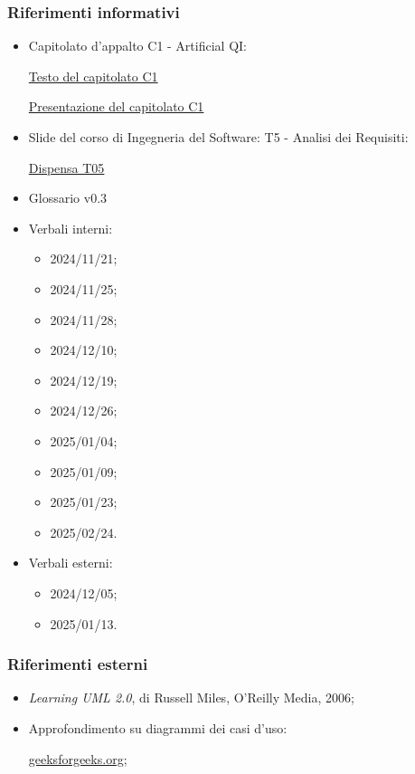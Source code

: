 \subsubsection{Riferimenti informativi}
\label{subsubsec:RiferimentiInformativi}
\begin{itemize}
    \item Capitolato d'appalto C1 - Artificial QI:
    
    \href{https://www.math.unipd.it/~tullio/IS-1/2024/Progetto/C1.pdf}{Testo del capitolato C1}
    
    \href{https://www.math.unipd.it/~tullio/IS-1/2024/Progetto/C1p.pdf}{Presentazione del capitolato C1}
    
    \item Slide del corso di Ingegneria del Software: T5 - Analisi dei Requisiti:
    
    \href{https://www.math.unipd.it/~tullio/IS-1/2024/Dispense/T05.pdf}{Dispensa T05}
    
    \item Glossario v0.3
    
    \item Verbali interni:
    \begin{itemize}
        \item 2024/11/21;
        \item 2024/11/25;
        \item 2024/11/28;
        \item 2024/12/10;
        \item 2024/12/19;
        \item 2024/12/26;
        \item 2025/01/04;
        \item 2025/01/09;
        \item 2025/01/23;
        \item 2025/02/24.
    \end{itemize}
    
    \item Verbali esterni:
    \begin{itemize}
        \item 2024/12/05;
        \item 2025/01/13.
    \end{itemize}
\end{itemize}

\subsubsection{Riferimenti esterni}
\label{subsubsubsec:RiferimentiEsterni}
\begin{itemize}
    \item \textit{Learning UML 2.0}, di Russell Miles, O'Reilly Media, 2006;
    \item Approfondimento su diagrammi dei casi d'uso:
    
    \href{https://www.geeksforgeeks.org/use-case-diagram/}{geeksforgeeks.org};

\end{itemize}